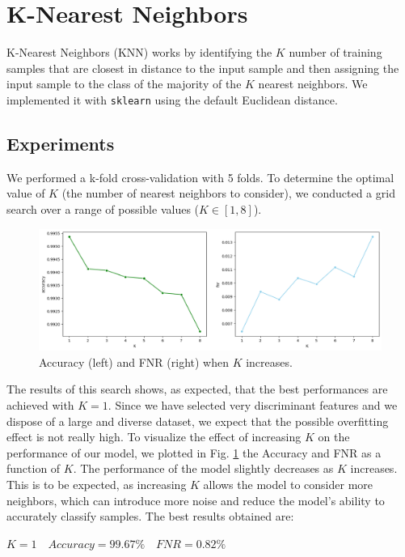\documentclass[twocolumn, switch]{article} %
\newcommand\x{0.7}
\begin{document}
\section{K-Nearest Neighbors}
\label{sec:knn}
K-Nearest Neighbors (KNN) works by identifying the $K$ number of training samples that are closest in distance to the input sample and then assigning the input sample to the class of the majority of the $K$ nearest neighbors. We implemented it with \texttt{sklearn} \cite{scikit-learn} using the default Euclidean distance.
\subsection{Experiments}
We performed a k-fold cross-validation with 5 folds.
To determine the optimal value of $K$ (the number of nearest neighbors to consider), we conducted a grid search over a range of possible values ($K \in [1, 8]$).
\begin{figure}[ht!]
	\centering
	\includegraphics[width=\x\linewidth]{knn_accuracy_fnr.png}
	\caption{Accuracy (left) and FNR (right) when $K$ increases.}
	\label{fig:knntrain}
	\vspace{-10pt}
\end{figure}
The results of this search shows, as expected, that the best performances are achieved with $K=1$. Since we have selected very discriminant features and we dispose of a large and diverse dataset, we expect that the possible overfitting effect is not really high.
To visualize the effect of increasing $K$ on the performance of our model, we plotted in Fig. \ref{fig:knntrain} the Accuracy and FNR as a function of $K$. The performance of the model slightly decreases as $K$ increases. This is to be expected, as increasing $K$ allows the model to consider more neighbors, which can introduce more noise and reduce the model's ability to accurately classify samples. The best results obtained are:
\begin{center}
	$K=1 \quad Accuracy=99.67\% \quad FNR=0.82\%$
\end{center}
\end{document}
